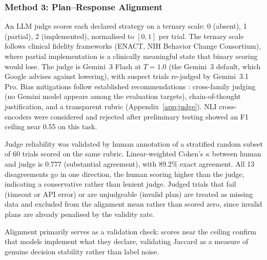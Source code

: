 \subsubsection{Method 3: Plan--Response Alignment}

An LLM judge scores each declared strategy on a ternary scale: 0 (absent), 1 (partial), 2 (implemented), normalised to $[0,1]$ per trial. The ternary scale follows clinical fidelity frameworks (ENACT, NIH Behavior Change Consortium), where partial implementation is a clinically meaningful state that binary scoring would lose. The judge is Gemini~3 Flash at $T{=}1.0$ (the Gemini~3 default, which Google advises against lowering), with suspect trials re-judged by Gemini~3.1 Pro. Bias mitigations follow established recommendations \citep{zheng2023judging}: cross-family judging (no Gemini model appears among the evaluation targets), chain-of-thought justification, and a transparent rubric (Appendix~\ref{app:judge}). NLI cross-encoders were considered and rejected after preliminary testing showed an F1 ceiling near 0.55 on this task.

Judge reliability was validated by human annotation of a stratified random subset of 60 trials scored on the same rubric. Linear-weighted Cohen's $\kappa$ between human and judge is $0.777$ (substantial agreement), with 89.2\% exact agreement. All 13 disagreements go in one direction, the human scoring higher than the judge, indicating a conservative rather than lenient judge. Judged trials that fail (timeout or API error) or are unjudgeable (invalid plan) are treated as missing data and excluded from the alignment mean rather than scored zero, since invalid plans are already penalised by the validity rate.

Alignment primarily serves as a validation check: scores near the ceiling confirm that models implement what they declare, validating Jaccard as a measure of genuine decision stability rather than label noise.

